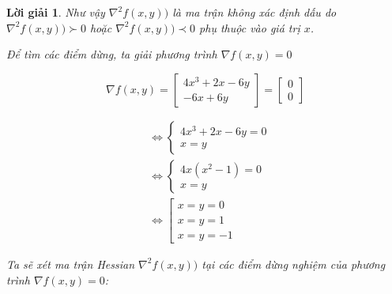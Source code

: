 \documentclass[14pt, a4paper]{article}
\theoremstyle{sltheorem}
\theoremstyle{soltheorem}
\newtheorem*{loigiai}{Lời giải}
\begin{document}
\begin{loigiai}
        Như vậy $\nabla^2 f(x,y))$ là ma trận không xác định dấu do $\nabla^2 f(x,y)) \succ 0$ hoặc $\nabla^2 f(x,y)) \prec 0$ phụ thuộc vào giá trị $x$.
        
        Để tìm các điểm dừng, ta giải phương trình $\nabla f(x, y) = 0$

        \begin{equation*}
            \nabla f(x, y) = \begin{bmatrix} 4x^3 + 2x - 6y \\ -6x + 6y \end{bmatrix} = \begin{bmatrix} 0 \\ 0 \end{bmatrix}
        \end{equation*}

        \begin{equation}
            \begin{aligned}
            &\Leftrightarrow \begin{cases} 4x^3 + 2x - 6y = 0 \\ x = y \end{cases} \\
            &\Leftrightarrow \begin{cases} 4x(x^2-1) = 0 \\ x = y \end{cases} \\
            &\Leftrightarrow \left [\begin{array}{l} x=y=0 \\ x=y=1 \\ x=y=-1 \end{array}\right.
            \end{aligned}
        \end{equation}

        Ta sẽ xét ma trận Hessian $\nabla^2 f(x,y))$ tại các điểm dừng nghiệm của phương trình $\nabla f(x, y) = 0$:


\end{loigiai}
\end{document}
